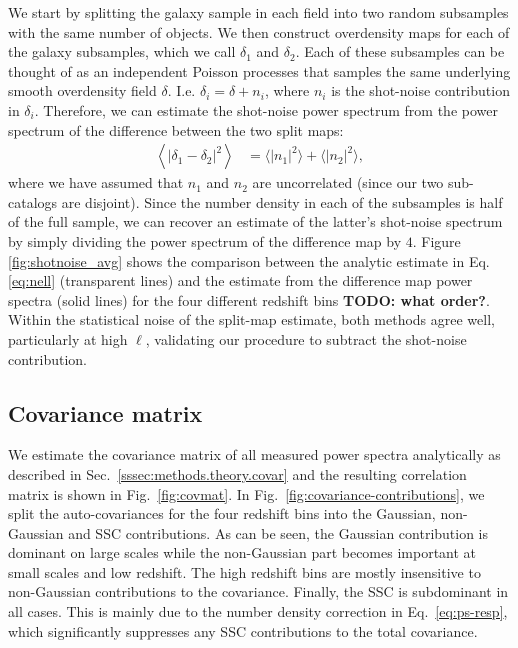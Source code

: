 \documentclass[a4paper,11pt]{article}
\newcommand{\todo}[1]{{\bf TODO: #1}}
\begin{document}
      We start by splitting the galaxy sample in each field into two random subsamples with the same number of objects.  We then construct overdensity maps for each of the galaxy subsamples, which we call $\delta_1$ and $\delta_2$.  Each of these subsamples can be thought of as an independent Poisson processes that samples the same underlying smooth overdensity field $\delta$. I.e. $\delta_i = \delta + n_i$, where $n_i$ is the shot-noise contribution in $\delta_i$. Therefore, we can estimate the shot-noise power spectrum from the power spectrum of the difference between the two split maps:
      \begin{align}
      \left\langle |\delta_1 - \delta_2|^2 \right\rangle & = \langle|n_1|^2\rangle + \langle|n_2|^2\rangle,
      \end{align}
      where we have assumed that $n_1$ and $n_2$ are uncorrelated (since our two sub-catalogs are disjoint). Since the number density in each of the subsamples is half of the full sample, we can recover an estimate of the latter's shot-noise spectrum by simply dividing the power spectrum of the difference map by $4$. Figure \ref{fig:shotnoise_avg} shows the comparison between the analytic estimate in Eq. \ref{eq:nell} (transparent lines) and the estimate from the difference map power spectra (solid lines) for the four different redshift bins \todo{what order?}. Within the statistical noise of the split-map estimate, both methods agree well, particularly at high $\ell$, validating our procedure to subtract the shot-noise contribution.
      
    
\subsection{Covariance matrix}\label{ssec:results.covariance}

We estimate the covariance matrix of all measured power spectra analytically as described in Sec.~\ref{sssec:methods.theory.covar} and the resulting correlation matrix is shown in Fig.~\ref{fig:covmat}. In Fig.~\ref{fig:covariance-contributions}, we split the auto-covariances for the four redshift bins into the Gaussian, non-Gaussian and SSC contributions. As can be seen, the Gaussian contribution is dominant on large scales while the non-Gaussian part becomes important at small scales and low redshift. The high redshift bins are mostly insensitive to non-Gaussian contributions to the covariance. Finally, the SSC is subdominant in all cases. This is mainly due to the number density correction in Eq.~\ref{eq:ps-resp}, which significantly suppresses any SSC contributions to the total covariance.
\end{document}
